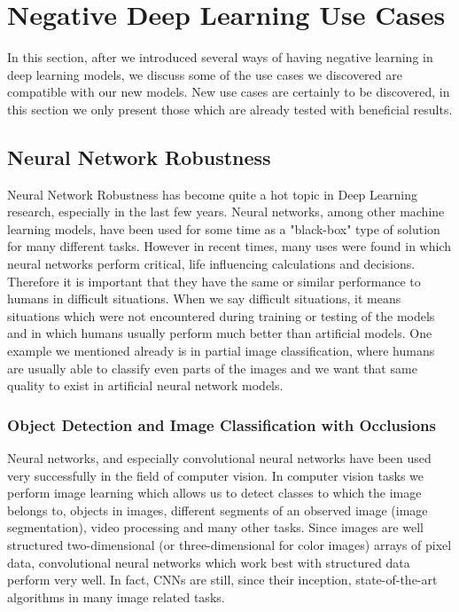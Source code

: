 \documentclass[b5paper]{book}
\let\cite\parencite
\begin{document}
\section{Negative Deep Learning Use Cases}

In this section, after we introduced several ways of having negative learning in deep learning models, we discuss some of the use cases we discovered are compatible with our new models. New use cases are certainly to be discovered, in this section we only present those which are already tested with beneficial results.

\subsection{Neural Network Robustness}

Neural Network Robustness has become quite a hot topic in Deep Learning research, especially in the last few years. \cite{carlini2017towards} Neural networks, among other machine learning models, have been used for some time as a "black-box" type of solution for many different tasks. However in recent times, many uses were found in which neural networks perform critical, life influencing calculations and decisions. Therefore it is important that they have the same or similar performance to humans in difficult situations. When we say difficult situations, it means situations which were not encountered during training or testing of the models and in which humans usually perform much better than artificial models. One example we mentioned already is in partial image classification, where humans are usually able to classify even parts of the images and we want that same quality to exist in artificial neural network models.

\subsubsection{Object Detection and Image Classification with Occlusions}

Neural networks, and especially convolutional neural networks have been used very successfully in the field of computer vision. In computer vision tasks we perform image learning which allows us to detect classes to which the image belongs to, objects in images, different segments of an observed image (image segmentation), video processing and many other tasks. Since images are well structured two-dimensional (or three-dimensional for color images) arrays of pixel data, convolutional neural networks which work best with structured data perform very well. In fact, CNNs are still, since their inception, state-of-the-art algorithms in many image related tasks. 
\end{document}

